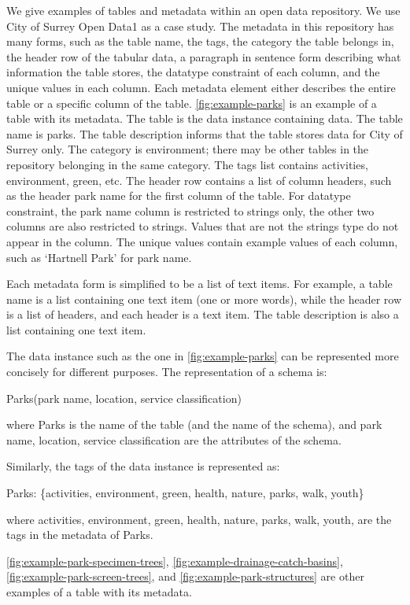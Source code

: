 We give examples of tables and metadata within an open data repository. We use City of Surrey Open Data1 as a case study. The metadata in this repository has many forms, such as the table name, the tags, the category the table belongs in, the header row of the tabular data, a paragraph in sentence form describing what information the table stores, the datatype constraint of each column, and the unique values in each column. Each metadata element either describes the entire table or a specific column of the table. \autoref{fig:example-parks} is an example of a table with its metadata. The table is the data instance containing data. The table name is parks. The table description informs that the table stores data for City of Surrey only. The category is environment; there may be other tables in the repository belonging in the same category. The tags list contains activities, environment, green, etc. The header row contains a list of column headers, such as the header park name for the first column of the table. For datatype constraint, the park name column is restricted to strings only, the other two columns are also restricted to strings. Values that are not the strings type do not appear in the column. The unique values contain example values of each column, such as `Hartnell Park' for park name.

Each metadata form is simplified to be a list of text items. For example, a table name is a list containing one text item (one or more words), while the header row is a list of headers, and each header is a text item. The table description is also a list containing one text item.

The data instance such as the one in \autoref{fig:example-parks} can be represented more concisely for different purposes. The representation of a schema is:

Parks(park name, location, service classification)

where Parks is the name of the table (and the name of the schema), and park name, location, service classification are the attributes of the schema.

Similarly, the tags of the data instance is represented as:

Parks: \{activities, environment, green, health, nature, parks, walk, youth\}

where activities, environment, green, health, nature, parks, walk, youth, are the tags in the metadata of Parks.

\autoref{fig:example-park-specimen-trees}, \autoref{fig:example-drainage-catch-basins}, \autoref{fig:example-park-screen-trees}, and \autoref{fig:example-park-structures} are other examples of a table with its metadata.

